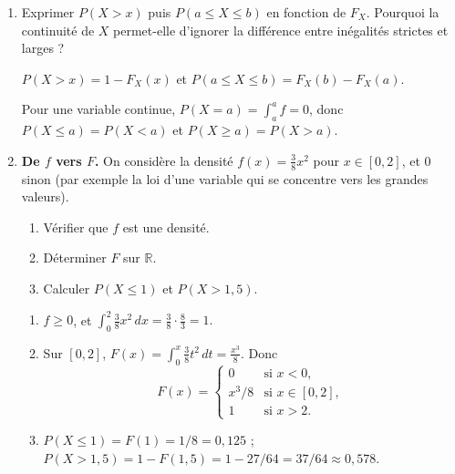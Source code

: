 \begin{enumerate}
  \item Exprimer $P(X>x)$ puis $P(a\le X\le b)$ en fonction de $F_X$.
  Pourquoi la continuité de $X$ permet-elle d'ignorer la différence
  entre inégalités strictes et larges ?
  \begin{solution}
    $P(X>x)=1-F_X(x)$ et $P(a\le X\le b)=F_X(b)-F_X(a)$.

    Pour une variable continue, $P(X=a)=\int_a^a f=0$,
    donc $P(X\le a)=P(X<a)$ et $P(X\ge a)=P(X>a)$.
  \end{solution}

  \item \textbf{De $f$ vers $F$.}
  On considère la densité
  $f(x)=\tfrac{3}{8}x^2$ pour $x\in[0,2]$, et $0$ sinon
  (par exemple la loi d'une variable qui se concentre vers les
  grandes valeurs).
  \begin{enumerate}
    \item Vérifier que $f$ est une densité.
    \item Déterminer $F$ sur $\mathbb R$.
    \item Calculer $P(X\le 1)$ et $P(X>1{,}5)$.
  \end{enumerate}
  \begin{solution}
    \begin{enumerate}
    \item $f\ge 0$, et
    $\int_0^2 \tfrac{3}{8}x^2\,dx=\tfrac{3}{8}\cdot\tfrac{8}{3}=1.$ \checkmark

    \item Sur $[0,2]$,
    $F(x)=\int_0^x\tfrac{3}{8}t^2\,dt=\tfrac{x^3}{8}.$
    Donc
    \[
      F(x)=\begin{cases}
        0 & \text{si } x<0,\\
        x^3/8 & \text{si } x\in[0,2],\\
        1 & \text{si } x>2.
      \end{cases}
    \]

    \item $P(X\le 1)=F(1)=1/8=0{,}125$ ;
    $P(X>1{,}5)=1-F(1{,}5)=1-27/64=37/64\approx 0{,}578.$
    \end{enumerate}
  \end{solution}
  \newpage


\end{enumerate}
